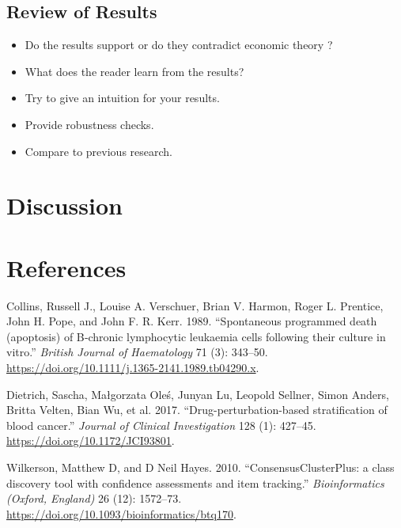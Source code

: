 \documentclass[11pt, a4paper, twosided]{book}
\newenvironment{CSLReferences}%
  {}%
  {\par}
\begin{document}
\hypertarget{review-of-results-1}{%
\section{Review of Results}\label{review-of-results-1}}
\begin{itemize}
\item
  Do the results support or do they contradict economic theory ?
\item
  What does the reader learn from the results?
\item
  Try to give an intuition for your results.
\item
  Provide robustness checks.
\item
  Compare to previous research.
\end{itemize}
\hypertarget{discussion-1}{%
\chapter{Discussion}\label{discussion-1}}

\newpage

\hypertarget{references}{%
\chapter*{References}\label{references}}

\noindent

\setlength{\parindent}{-0.5cm}
\setlength{\leftskip}{0.5cm}
\setlength{\parskip}{8pt}

\hypertarget{refs}{}
\begin{CSLReferences}{1}{0}
\leavevmode{}%
Collins, Russell J., Louise A. Verschuer, Brian V. Harmon, Roger L. Prentice, John H. Pope, and John F. R. Kerr. 1989. {``{Spontaneous programmed death (apoptosis) of B‐chronic lymphocytic leukaemia cells following their culture in vitro}.''} \emph{British Journal of Haematology} 71 (3): 343--50. \url{https://doi.org/10.1111/j.1365-2141.1989.tb04290.x}.

\leavevmode{}%
Dietrich, Sascha, Małgorzata Oleś, Junyan Lu, Leopold Sellner, Simon Anders, Britta Velten, Bian Wu, et al. 2017. {``{Drug-perturbation-based stratification of blood cancer}.''} \emph{Journal of Clinical Investigation} 128 (1): 427--45. \url{https://doi.org/10.1172/JCI93801}.

\leavevmode{}%
Wilkerson, Matthew D, and D Neil Hayes. 2010. {``{ConsensusClusterPlus: a class discovery tool with confidence assessments and item tracking.}''} \emph{Bioinformatics (Oxford, England)} 26 (12): 1572--73. \url{https://doi.org/10.1093/bioinformatics/btq170}.

\end{CSLReferences}
\indent
\setlength{\parindent}{17pt}
\setlength{\leftskip}{0pt}
\setlength{\parskip}{0pt}
\end{document}
